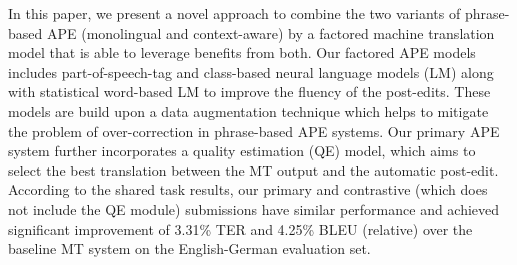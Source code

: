 In this paper, we present a novel approach to combine the two variants of phrase-based APE (monolingual and context-aware) by a factored machine translation model that is able to leverage benefits from both. Our factored APE models includes part-of-speech-tag and class-based neural language models (LM) along with statistical word-based LM to improve the fluency of the post-edits. These models are build upon a data augmentation technique which helps to mitigate the problem of over-correction in phrase-based APE systems. Our primary APE system further incorporates a quality estimation (QE) model, which aims to select the best translation between the MT output and the automatic post-edit. According to the shared task results, our primary and contrastive (which does not include the QE module) submissions have similar performance and achieved significant improvement of 3.31\% TER and 4.25\% BLEU (relative) over the baseline MT system on the English-German evaluation set.

